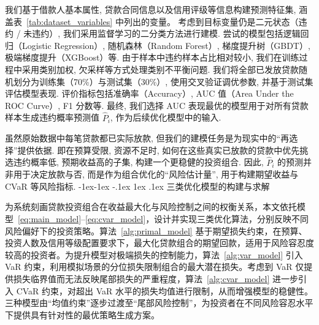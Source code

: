 \documentclass{write_paper}
\makeatletter
\renewcommand\subsection{\@startsection{subsection}{2}{\z@}%
                                     {-1ex\@plus -1ex \@minus -.1ex}%
                                     {1ex \@plus .1ex}%
                                     {\normalfont \normalsize \bfseries}}
\makeatother
\begin{document}
我们基于借款人基本属性, 贷款合同信息以及信用评级等信息构建预测特征集, 涵盖表~\ref{tab:dataset_variables} 中列出的变量。
考虑到目标变量仍是二元状态（违约 / 未违约）, 我们采用监督学习的二分类方法进行建模. 尝试的模型包括逻辑回归（Logistic Regression）, 随机森林（Random Forest）, 梯度提升树（GBDT）, 极端梯度提升（XGBoost）等. 
由于样本中违约样本占比相对较小, 我们在训练过程中采用类别加权, 欠采样等方式处理类别不平衡问题. 
我们将全部已发放贷款随机划分为训练集（70\%）与测试集（30\%）, 使用交叉验证调优参数, 并基于测试集评估模型表现. 评价指标包括准确率（Accuracy）, AUC 值（Area Under the ROC Curve）, F1 分数等. 
最终, 我们选择 AUC 表现最优的模型用于对所有贷款样本生成违约概率预测值 $\hat{P}_i$, 作为后续优化模型中的输入. 
 
虽然原始数据中每笔贷款都已实际放款, 但我们的建模任务是为现实中的“再选择”提供依据. 即在预算受限, 资源不足时, 如何在这些真实已放款的贷款中优先挑选违约概率低, 预期收益高的子集, 构建一个更稳健的投资组合. 因此, $\hat{P}_i$ 的预测并非用于决定放款与否, 而是作为组合优化的“风险估计量”, 用于构建期望收益与 CVaR 等风险指标. 
\subsection{三类优化模型的构建与求解}
\label{subsec:model_solving}

为系统刻画贷款投资组合在收益最大化与风险控制之间的权衡关系，本文依托模型~\eqref{eq:main_model}--\eqref{eq:cvar_model}，设计并实现三类优化算法，分别反映不同风险偏好下的投资策略。算法~\ref{alg:primal_model} 基于期望损失约束，在预算、投资人数及信用等级配置要求下，最大化贷款组合的期望回款，适用于风险容忍度较高的投资者。为提升模型对极端损失的控制能力，算法~\ref{alg:var_model} 引入 VaR 约束，利用模拟场景的分位损失限制组合的最大潜在损失。考虑到 VaR 仅提供损失临界值而无法反映尾部损失的严重程度，算法~\ref{alg:cvar_model} 进一步引入 CVaR 约束，对超出 VaR 水平的损失均值进行限制，从而增强模型的稳健性。三种模型由“均值约束”逐步过渡至“尾部风险控制”，为投资者在不同风险容忍水平下提供具有针对性的最优策略生成方案。
\end{document}
